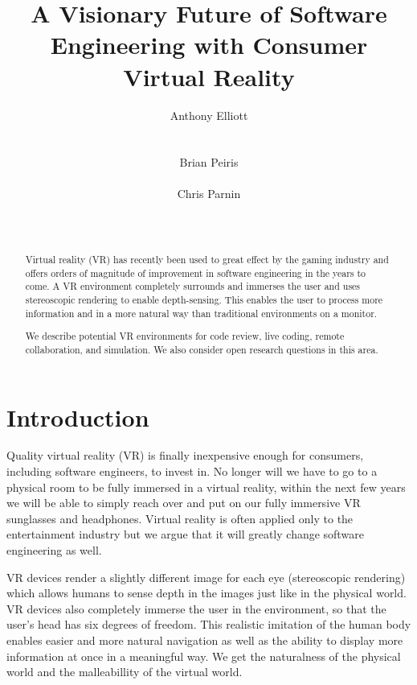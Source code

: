 \documentclass{acm_proc_article-sp}
\begin{document}
\title{A Visionary Future of Software Engineering with Consumer Virtual Reality}

\author{
\alignauthor
Anthony Elliott\\
       \\
       \\
\alignauthor
Brian Peiris\\
       \\
\alignauthor
Chris Parnin\\
       \\
       \\
}

\maketitle
\begin{abstract}
Virtual reality (VR) has recently been used to great effect by the gaming industry and offers orders of magnitude of improvement in software engineering in the years to come.
A VR environment completely surrounds and immerses the user and uses stereoscopic rendering to enable depth-sensing. This enables the user to process more information and in a more natural way than traditional environments on a monitor.

We describe potential VR environments for code review, live coding, remote collaboration, and simulation.
We also consider open research questions in this area.
\end{abstract}

\section{Introduction}
Quality virtual reality (VR) is finally inexpensive enough for consumers, including software engineers, to invest in. No longer will we have to go to a physical room to be fully immersed in a virtual reality, within the next few years we will be able to simply reach over and put on our fully immersive VR sunglasses and headphones. Virtual reality is often applied only to the entertainment industry but we argue that it will greatly change software engineering as well. 

VR devices render a slightly different image for each eye (stereoscopic rendering) which allows humans to sense depth in the images just like in the physical world. VR devices also completely immerse the user in the environment, so that the user's head has six degrees of freedom. This realistic imitation of the human body enables easier and more natural navigation as well as the ability to display more information at once in a meaningful way. We get the naturalness of the physical world and the malleabillity of the virtual world.
\end{document}

